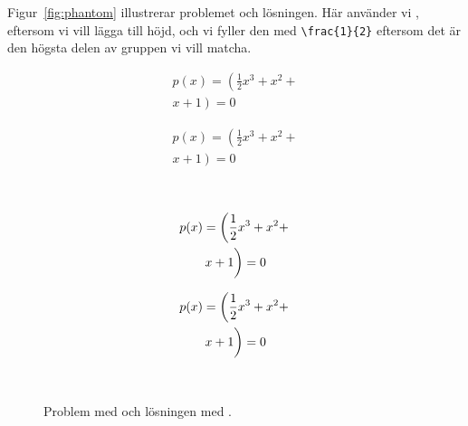 \documentclass[../../a4.tex]{subfiles}
\begin{document}
Figur~\vref{fig:phantom} illustrerar problemet och lösningen. Här använder
vi , eftersom vi vill lägga till höjd, och vi fyller den med
\verb|\frac{1}{2}| eftersom det är den högsta delen av gruppen vi vill
matcha.

\begin{figure}[tbp]
	\centering
	\begin{minipage}{\textwidth}
		\begin{minipage}{0.4\textwidth} %
			\begin{multline}
				p(x) = \left(\frac{1}{2}x^3 + x^2 + \right. \\
				\left. x + 1 \right) = 0
			\end{multline}
		\end{minipage}
		\hfill
		\begin{minipage}{0.55\textwidth} %
\begin{latexcode}
\begin{multline}
p(x) = \left(\frac{1}{2}x^3 +
     x^2 + \right. \\
\left. x + 1 \right) = 0
\end{multline}
\end{latexcode}
		\end{minipage}
	\end{minipage}\\
	\begin{minipage}{\textwidth}
		\begin{minipage}{0.4\textwidth} %
			\begin{multline}
				p(x) = \left(\frac{1}{2}x^3 + x^2 + \right. \\
				\left. x + 1 \vphantom{\frac{1}{2}}\right) = 0
			\end{multline}
		\end{minipage}
		\hfill
		\begin{minipage}{0.55\textwidth} %
\begin{latexcode}
\begin{multline}
p(x) = \left(\frac{1}{2}x^3 +
     x^2 + \right. \\
\left. x + 1 \vphantom{
\frac{1}{2} }\right) = 0
\end{multline}
\end{latexcode}
		\end{minipage}
	\end{minipage}\\
	\caption{Problem med  och lösningen med .}
	\label{fig:phantom}
\end{figure}
\end{document}

